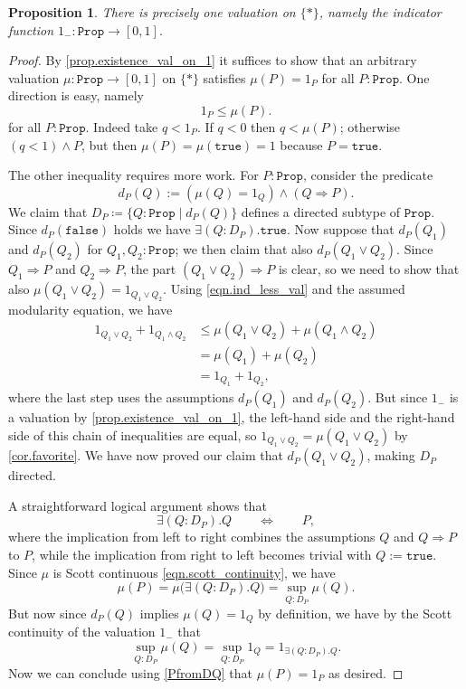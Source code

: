 \documentclass[11pt, oneside, article]{memoir}
\theoremstyle{plain}
\newtheorem{proposition}[theorem]{Proposition}
\theoremstyle{definition}
\theoremstyle{remark}
\newcommand{\const}[1]{\mathtt{#1}}
\newcommand{\ind}[1]{1_{#1}}
\newcommand{\inc}{\ind{-}}				%
\newcommand{\prop}{\const{Prop}}
\newcommand{\true}{\const{true}}
\newcommand{\false}{\const{false}}
\begin{document}
\begin{proposition}\label{prop.uniqueness_val_on_1}
	There is precisely one valuation on $\{*\}$, namely the indicator function $\inc : \prop \to [0,1]$.
\end{proposition}
\begin{proof}
By \cref{prop.existence_val_on_1} it suffices to show that an arbitrary valuation $\mu : \prop \to [0,1]$ on $\{*\}$ satisfies $\mu(P) = \ind{P}$ for all $P : \prop$. One direction is easy, namely
	\begin{equation}\label{eqn.ind_less_val}
		\ind{P} \le \mu(P).
	\end{equation}
	for all $P:\prop$. Indeed take $q<\ind{P}$. If $q<0$ then $q<\mu(P)$; otherwise $(q<1)\wedge P$, but then $\mu(P)=\mu(\true)=1$ because $P=\true$. 
	
	The other inequality requires more work. For $P:\prop$, consider the predicate
	\[
		d_P(Q) := \left( \mu(Q) = \ind{Q} \right) \land (Q \Rightarrow P).
	\]
	We claim that $D_P\coloneqq\{Q:\prop\mid d_P(Q)\}$ defines a directed subtype of $\prop$. Since $d_P(\false)$ holds we have $\exists(Q:D_P).\true$. Now suppose that $d_P(Q_1)$ and $d_P(Q_2)$ for $Q_1, Q_2 : \prop$; we then claim that also $d_P(Q_1 \lor Q_2)$. Since $Q_1 \Rightarrow P$ and $Q_2 \Rightarrow P$, the part $(Q_1 \lor Q_2) \Rightarrow P$ is clear, so we need to show that also $\mu(Q_1 \lor Q_2) = \ind{Q_1 \lor Q_2}$. Using \eqref{eqn.ind_less_val} and the assumed modularity equation, we have
	\begin{align*}
		\ind{Q_1 \lor Q_2} + \ind{Q_1 \land Q_2}	& \le \mu(Q_1 \lor Q_2) + \mu(Q_1 \land Q_2)	\\
								& = \mu(Q_1) + \mu(Q_2) \\
								& = \ind{Q_1} + \ind{Q_2},
	\end{align*}
	where the last step uses the assumptions $d_P(Q_1)$ and $d_P(Q_2)$. But since $\inc$ is a valuation by \cref{prop.existence_val_on_1}, the left-hand side and the right-hand side of this chain of inequalities are equal, so $\ind{Q_1 \lor Q_2} = \mu(Q_1 \lor Q_2)$ by \cref{cor.favorite}. We have now proved our claim that $d_P(Q_1 \lor Q_2)$, making $D_P$ directed.

	A straightforward logical argument shows that
	\begin{equation}
		\label{PfromDQ}
		\exists (Q : D_P). Q \qquad \Longleftrightarrow \qquad P,
	\end{equation}
	where the implication from left to right combines the assumptions $Q$ and $Q \Rightarrow P$ to $P$, while the implication from right to left becomes trivial with $Q := \true$. Since $\mu$ is Scott continuous \eqref{eqn.scott_continuity}, we have
	\[
		\mu(P) = \mu\big( \exists (Q : D_P) . Q \big) = \sup_{Q : D_P} \mu(Q).
	\]
	But now since $d_P(Q)$ implies $\mu(Q) = \ind{Q}$ by definition, we have by the Scott continuity of the valuation $\inc$ that
	\[
		\sup_{Q : D_P} \mu(Q) = \sup_{Q : D_P} \ind{Q} = \ind{\exists(Q:D_P).Q}.
	\]
Now we can conclude using \eqref{PfromDQ} that $\mu(P)=\ind{P}$ as desired.
\end{proof}
\end{document}
